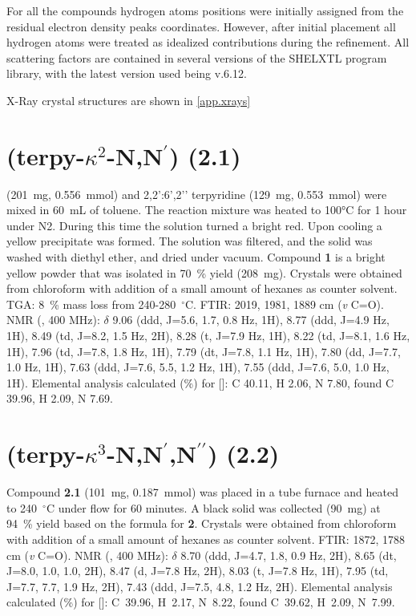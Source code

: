 For all the compounds hydrogen atoms positions were initially assigned from the residual electron density peaks coordinates. However, after initial placement all hydrogen atoms were treated as idealized contributions during the refinement. All scattering factors are contained in several versions of the SHELXTL program library, with the latest version used being v.6.12\autocite{sheldrick2008}.

X-Ray crystal structures are shown in \autoref{app.xrays}

\section{(terpy-$\kappa^2$-N,N$^\prime$) (2.1)}\label{sec.c1}
 (201~mg,  0.556~mmol) and 2,2’:6’,2’’ terpyridine (129~mg, 0.553~mmol) were mixed in 60~mL of toluene. The reaction mixture was heated to 100°C for 1 hour under N2. During this time the solution turned a bright red. Upon cooling a yellow precipitate was formed. The solution was filtered, and the solid was washed with diethyl ether, and dried under vacuum. Compound \textbf{1} is a bright yellow powder that was isolated in 70~\% yield (208~mg). Crystals were obtained from chloroform with addition of a small amount of hexanes as counter solvent. TGA: 8~\% mass loss from 240-280~$^\circ$C.  FTIR: 2019, 1981, 1889 cm (\textit{v} C=O).  NMR (, 400 MHz): $\delta$ 9.06 (ddd, J=5.6, 1.7, 0.8 Hz, 1H), 8.77 (ddd, J=4.9 Hz, 1H), 8.49 (td, J=8.2, 1.5 Hz, 2H), 8.28 (t, J=7.9 Hz, 1H), 8.22 (td, J=8.1, 1.6 Hz, 1H), 7.96 (td, J=7.8, 1.8 Hz, 1H), 7.79 (dt, J=7.8, 1.1 Hz, 1H), 7.80 (dd, J=7.7, 1.0 Hz, 1H), 7.63 (ddd, J=7.6, 5.5, 1.2 Hz, 1H), 7.55 (ddd, J=7.6, 5.0, 1.0 Hz, 1H). Elemental analysis calculated (\%) for []: C 40.11, H 2.06, N 7.80, found C 39.96, H 2.09, N 7.69.

\section{(terpy-$\kappa^3$-N,N$^\prime$,N$^{\prime \prime}$) (2.2)}\label{sec.c2}
Compound \textbf{2.1} (101~mg, 0.187~mmol) was placed in a tube furnace and heated to 240~$^\circ$C under  flow for 60 minutes. A black solid was collected (90~mg) at 94~\% yield based on the formula for \textbf{2}. Crystals were obtained from chloroform with addition of a small amount of hexanes as counter solvent. FTIR: 1872, 1788 cm (\textit{v} C=O).  NMR (, 400 MHz): $\delta$ 8.70 (ddd, J=4.7, 1.8, 0.9 Hz, 2H), 8.65 (dt, J=8.0, 1.0, 1.0, 2H), 8.47 (d, J=7.8 Hz, 2H), 8.03 (t, J=7.8 Hz, 1H), 7.95 (td, J=7.7, 7.7, 1.9 Hz, 2H), 7.43 (ddd, J=7.5, 4.8, 1.2 Hz, 2H). Elemental analysis calculated (\%) for []: C~39.96, H~2.17, N~8.22, found C~39.62, H~2.09, N~7.99.

